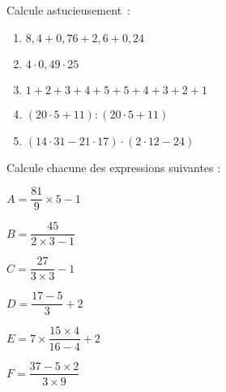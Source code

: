 \begin{exercice}
Calcule astucieusement :
\begin{enumerate}
 \item $8,4 + 0,76 + 2,6 + 0,24$ \dotfill
 \item $4 \cdot 0,49 \cdot 25$ \dotfill
 \item $1 + 2 + 3 + 4 + 5 + 5 + 4 + 3 + 2 + 1$ \dotfill

 \dotfill

 \item $(20 \cdot 5 + 11) : (20 \cdot 5 + 11)$ \dotfill
 
 \dotfill
 
 \item $(14 \cdot  31 - 21 \cdot  17) \cdot  (2 \cdot  12 - 24)$ \dotfill
 
 \dotfill
 \end{enumerate}
\end{exercice}


\newpage

\begin{exercice}
Calcule chacune des expressions suivantes :

$A = \dfrac{81}{9} \times 5 - 1$ \dotfill

\dotfill

$B = \dfrac{45}{2 \times 3 - 1}$ \dotfill

\dotfill

\dotfill

$C = \dfrac{27}{3 \times 3} - 1$ \dotfill

\dotfill

\dotfill

$D = \dfrac{17 - 5}{3} + 2$ \dotfill 

\dotfill

\dotfill

$E = 7 \times \dfrac{15 \times 4}{16 - 4} + 2$ \dotfill 

\dotfill

\dotfill

$F = \dfrac{37 - 5 \times 2}{3 \times 9}$ \dotfill

\dotfill

\dotfill
\end{exercice}




